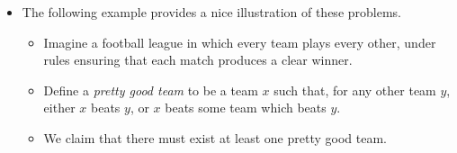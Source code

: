 \documentclass{beamer}
\begin{document}
\begin{frame}
	\begin{itemize}
		\item The following example provides a nice
		illustration of these problems.
\begin{itemize}
\item Imagine a football league in which every team plays every other, under rules ensuring that each match produces a clear winner. 
\item Define a {\em pretty good team} to be a team $x$ such that, for any other team $y$, either
$x$ beats $y$, or $x$ beats some team which beats $y$. 
\item We claim that there must exist at least one pretty good team.
\end{itemize}	
\end{itemize}
\end{frame}
\end{document}
